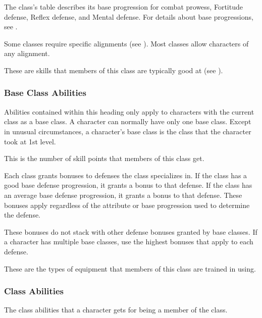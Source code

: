         The class's table describes its base progression for combat prowess, Fortitude defense, Reflex defense, and Mental defense.
        For details about base progressions, see .

        Some classes require specific alignments (see ).
        Most classes allow characters of any alignment.

        These are skills that members of this class are typically good at (see ).

        \subsubsection{Base Class Abilities}

            Abilities contained within this heading only apply to characters with the current class as a base class.
            A character can normally have only one base class.
            Except in unusual circumstances, a character's base class is the class that the character took at 1st level.

            This is the number of skill points that members of this class get.

            Each class grants bonuses to defenses the class specializes in.
            If the class has a good base defense progression, it grants a  bonus to that defense.
            If the class has an average base defense progression, it grants a  bonus to that defense.
            These bonuses apply regardless of the attribute or base progression used to determine the defense.

            These bonuses do not stack with other defense bonuses granted by base classes.
            If a character has multiple base classes, use the highest bonuses that apply to each defense.

            These are the types of equipment that members of this class are trained in using.

        \subsubsection{Class Abilities}
            The class abilities that a character gets for being a member of the class.

